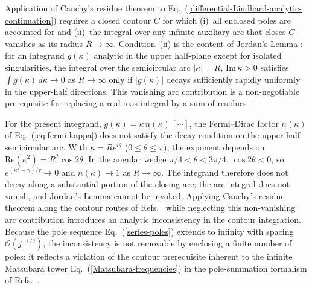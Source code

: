 \documentclass[aps,showkeys,noshowpacs,superscriptaddress,pre,preprint]{revtex4-2}
\begin{document}
Application of Cauchy's residue theorem to Eq.~(\ref{differential-Lindhard-analytic-continuation})
requires a closed contour $C$ for which (i)~all enclosed poles are accounted for and
(ii)~the integral over any infinite auxiliary arc that closes $C$ vanishes as its radius $R \to \infty$.
Condition~(ii) is the content of Jordan's Lemma \cite{Jordan1894,Arfken-Weber1995}:
for an integrand $g(\kappa)$ analytic in the upper half-plane except for isolated singularities,
the integral over the semicircular arc $|\kappa| = R$, $\mathrm{Im}\,\kappa > 0$ satisfies
$\int g(\kappa)\,d\kappa \to 0$ as $R \to \infty$ only if $|g(\kappa)|$ decays sufficiently rapidly
uniformly in the upper-half directions.
This vanishing arc contribution is a non-negotiable prerequisite for replacing a real-axis integral
by a sum of residues~\cite{Byron-Fuller1992}.

For the present integrand, $g(\kappa) = \kappa\, n(\kappa)\,[\cdots]$,
the Fermi--Dirac factor $n(\kappa)$ of Eq.~(\ref{eq:fermi-kappa})
does not satisfy the decay condition on the upper-half semicircular arc.
With $\kappa = R e^{i\theta}$ ($0 \le \theta \le \pi$),
the exponent depends on $\mathrm{Re}\!\left(\kappa^2\right) = R^2 \cos 2\theta$.
In the angular wedge $\pi/4 < \theta < 3\pi/4$, $\cos 2\theta < 0$,
so $e^{\left(\kappa^2 - \gamma\right)/\tau} \to 0$ and $n(\kappa) \to 1$ as $R \to \infty$.
The integrand therefore does not decay along a substantial portion of the closing arc;
the arc integral does not vanish, and Jordan's Lemma \cite{Jordan1894,Arfken-Weber1995} cannot be invoked.
Applying Cauchy's residue theorem along the contour routes of Refs.~\cite{Khanna-Glyde1976,Gouedard-Deutsch1978} while neglecting this non-vanishing arc contribution
introduces an analytic inconsistency in the contour integration.
Because the pole sequence Eq.~(\ref{series-poles}) extends to infinity with spacing $\mathcal{O}(j^{-1/2})$,
the inconsistency is not removable by enclosing a finite number of poles:
it reflects a violation of the contour prerequisite inherent to the infinite Matsubara tower Eq.~(\ref{Matsubara-frequencies}) in the pole-summation formalism of Refs.~\cite{Khanna-Glyde1976,Gouedard-Deutsch1978}.
\end{document}
